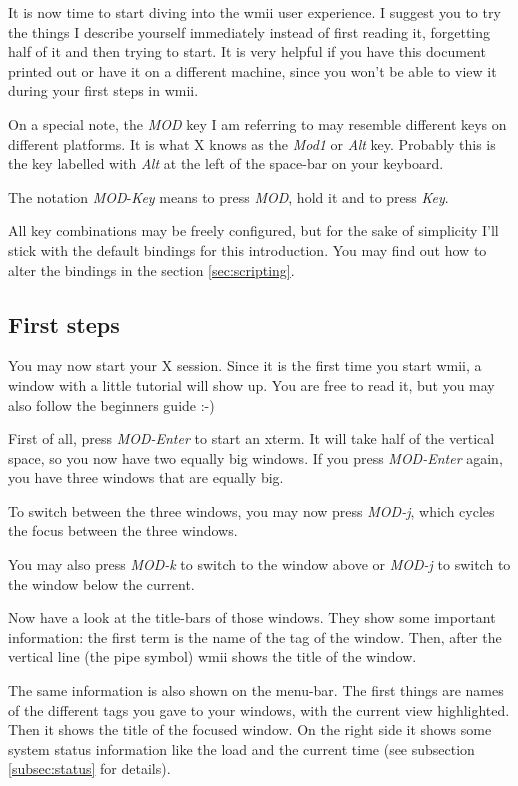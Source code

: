 \documentclass[12pt,a4paper]{article} %
\begin{document}
  It is now time to start diving into the wmii user experience. I
  suggest you to try the things I describe yourself immediately
  instead of first reading it, forgetting half of it and then trying
  to start. It is very helpful if you have this document printed out
  or have it on a different machine, since you won't be able to view
  it during your first steps in wmii.

  On a special note, the \emph{MOD} key I am referring to may resemble
  different keys on different platforms. It is what X knows as the
  \emph{Mod1} or \emph{Alt} key. Probably this is the key labelled with
  \emph{Alt} at the left of the space-bar on your keyboard.

  The notation \emph{MOD}-\emph{Key} means to press \emph{MOD}, hold
  it and to press \emph{Key}.

  All key combinations may be freely configured, but for the sake of
  simplicity I'll stick with the default bindings for this
  introduction.  You may find out how to alter the bindings in the
  section \ref{sec:scripting}.

  \subsection{First steps}

    You may now start your X session. Since it is the first time you
    start wmii, a window with a little tutorial will show up. You are
    free to read it, but you may also follow the beginners guide :-)

    First of all, press \emph{MOD-Enter} to start an xterm. It will
    take half of the vertical space, so you now have two equally big
    windows. If you press \emph{MOD-Enter} again, you have three
    windows that are equally big.

    To switch between the three windows, you may now press
    \emph{MOD-j}, which cycles the focus between the three windows.

    You may also press \emph{MOD-k} to switch to the window above or
    \emph{MOD-j} to switch to the window below the current.

    Now have a look at the title-bars of those windows. They show some
    important information: the first term is the name of the tag of
    the window. Then, after the vertical line (the pipe symbol) wmii
    shows the title of the window.

    The same information is also shown on the menu-bar. The first
    things are names of the different tags you gave to your windows,
    with the current view highlighted. Then it shows the title of the
    focused window. On the right side it shows some system status
    information like the load and the current time (see subsection~%
    \ref{subsec:status} for details).
\end{document}
